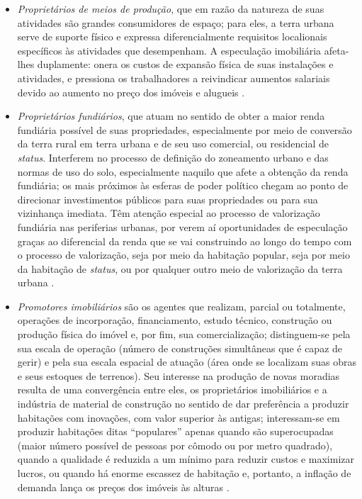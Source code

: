 \begin{itemize}
\item \textit{Proprietários de meios de produção}, que em razão da natureza de suas atividades são grandes consumidores de espaço; para eles, a terra urbana serve de suporte físico e expressa diferencialmente requisitos localionais específicos às atividades que desempenham. A especulação imobiliária afeta-lhes duplamente: onera os custos de expansão física de suas instalações e atividades, e pressiona os trabalhadores a reivindicar aumentos salariais devido ao aumento no preço dos imóveis e alugueis \cite[p.~13-16]{CORREA1985espa}.
\item \textit{Proprietários fundiários}, que atuam no sentido de obter a maior renda fundiária possível de suas propriedades, especialmente por meio de conversão da terra rural em terra urbana e de seu uso comercial, ou residencial de \textit{status}. Interferem no processo de definição do zoneamento urbano e das normas de uso do solo, especialmente naquilo que afete a obtenção da renda fundiária; os mais próximos às esferas de poder político chegam ao ponto de direcionar investimentos públicos para suas propriedades ou para sua vizinhança imediata. Têm atenção especial ao processo de valorização fundiária nas periferias urbanas, por verem aí oportunidades de especulação graças ao diferencial da renda que se vai construindo ao longo do tempo com o processo de valorização, seja por meio da habitação popular, seja por meio da habitação de \textit{status}, ou por qualquer outro meio de valorização da terra urbana \cite[p.~16-19]{CORREA1985espa}.
\item \textit{Promotores imobiliários} são os agentes que realizam, parcial ou totalmente, operações de incorporação, financiamento, estudo técnico, construção ou produção física do imóvel e, por fim, sua comercialização; distinguem-se pela sua escala de operação (número de construções simultâneas que é capaz de gerir) e pela sua escala espacial de atuação (área onde se localizam suas obras e seus estoques de terrenos). Seu interesse na produção de novas moradias resulta de uma convergência entre eles, os proprietários imobiliários e a indústria de material de construção no sentido de dar preferência a produzir habitações com inovações, com valor superior às antigas; interessam-se em produzir habitações ditas ``populares'' apenas quando são superocupadas (maior número possível de pessoas por cômodo ou por metro quadrado), quando a qualidade é reduzida a um mínimo para reduzir custos e maximizar lucros, ou quando há enorme escassez de habitação e, portanto, a inflação de demanda lança os preços dos imóveis às alturas \cite[p.~19-24]{CORREA1985espa}.

\end{itemize}
